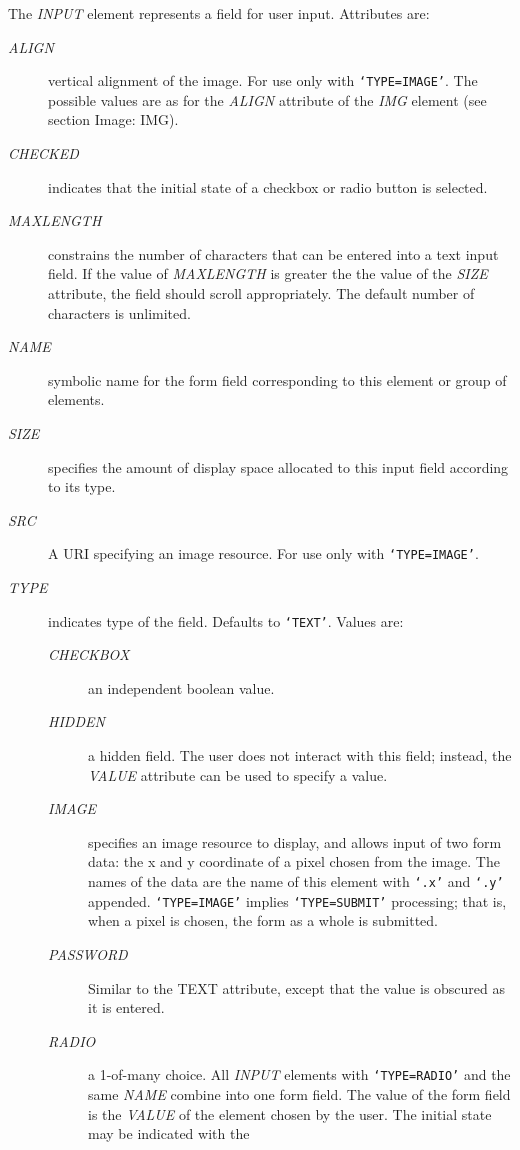The {\it INPUT} element represents a field for user input.  Attributes are:
\par \begin{description}\item[{\it ALIGN}]
vertical alignment of the image.  For use only with
{\tt `TYPE=IMAGE'}.  The possible values are as for the {\it ALIGN}
attribute of the {\it IMG} element (see section Image:  IMG).
\item[{\it CHECKED}]
indicates that the initial state of a checkbox or radio
button is selected.
\item[{\it MAXLENGTH}]
constrains the number of characters that can be
entered into a text input field.  If the value of {\it MAXLENGTH} is
greater the the value of the {\it SIZE} attribute, the field should
scroll appropriately.  The default number of characters is unlimited.
\item[{\it NAME}]
symbolic name for the form field corresponding to this
element or group of elements.
\item[{\it SIZE}]
specifies the amount of display space allocated to this
input field according to its type.
\item[{\it SRC}]
A URI specifying an image resource.  For use only with
{\tt `TYPE=IMAGE'}.
\item[{\it TYPE}]
indicates type of the field.  Defaults to
{\tt `TEXT'}.  Values are:
\begin{description}\item[{\it CHECKBOX}]
an independent boolean value.
\item[{\it HIDDEN}]
a hidden field.  The user does not interact with this
field;  instead, the {\it VALUE} attribute can be used to specify a
value.
\item[{\it IMAGE}]
specifies an image resource to display, and allows input
of two form data:  the x and y coordinate of a pixel chosen from the
image.  The names of the data are the name of this element with
{\tt `.x'} and {\tt `.y'} appended.  {\tt `TYPE=IMAGE'} implies
{\tt `TYPE=SUBMIT'} processing;  that is, when a pixel is chosen, the
form as a whole is submitted.
\item[{\it PASSWORD}]
Similar to the TEXT attribute, except that the value is
obscured as it is entered.
\item[{\it RADIO}]
a 1-of-many choice.  All {\it INPUT} elements with
{\tt `TYPE=RADIO'} and the same {\it NAME} combine into one form
field.  The value of the form field is the {\it VALUE} of the element
chosen by the user.  The initial state may be indicated with the

\end{description}
\end{description}
